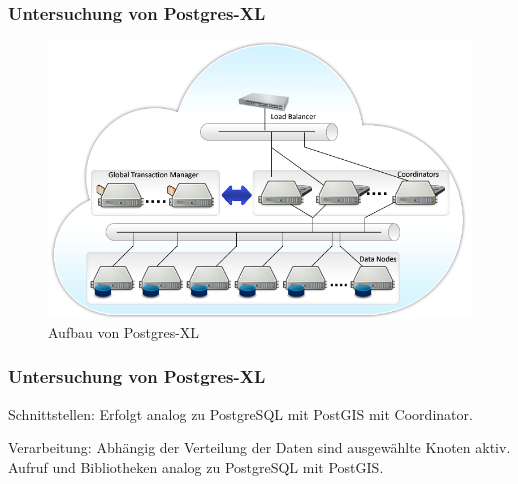\documentclass{beamer}
\begin{document}
%
\begin{frame}\frametitle{Untersuchung von Postgres-XL}

\begin{figure}
\centering
\includegraphics[width=1\hsize]{../Abbildungen/postgresxl-structure.jpg}
\caption{Aufbau von Postgres-XL}
\end{figure}
\end{frame}

\begin{frame}\frametitle{Untersuchung von Postgres-XL}
\begin{block}{Schnittstellen:}
Erfolgt analog zu PostgreSQL mit PostGIS mit Coordinator.
\end{block}

\vspace{\baselineskip}
\vspace{\baselineskip}

\begin{block}{Verarbeitung:}
Abhängig der Verteilung der Daten sind ausgewählte Knoten aktiv.\\
Aufruf und Bibliotheken analog zu PostgreSQL mit PostGIS.
\end{block}

\end{frame}
\end{document}
